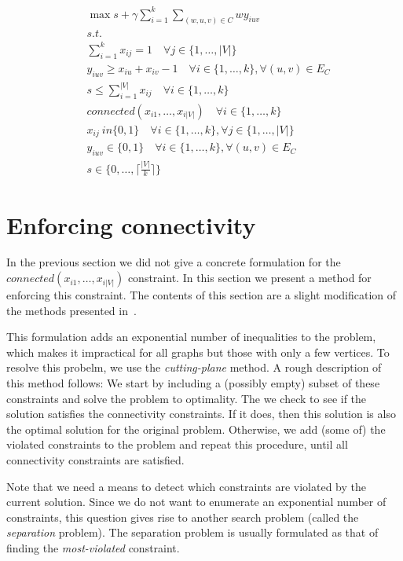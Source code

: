 \documentclass[]{article}
\begin{document}
\begin{align}
&\max s + \gamma \sum_{i=1}^{k} \sum_{(w, u, v) \in C} w y_{iuv} \\
&\textit{s.t.} \\
& \sum_{i=1}^k x_{ij} = 1 \quad \forall j \in \{1, \ldots, |V|\} \\
& y_{iuv} \geq x_{iu} + x_{iv} -1 \quad \forall i \in \{1, \ldots, k\}, \forall (u, v) \in E_{C} \\
&s \leq \sum_{i=1}^{|V|} x_{ij} \quad \forall i \in \{1, \ldots, k\} \\
& connected(x_{i1}, \ldots, x_{i|V|}) \quad \forall i \in \{1, \ldots, k\} \\
& x_{ij} \ in \{0, 1\} \quad \forall i \in \{1, \ldots, k\}, \forall j \in \{1, \ldots, |V|\} \\
& y_{iuv} \in \{0, 1\} \quad \forall i \in \{1, \ldots, k\}, \forall (u, v) \in E_{C} \\
& s \in \{0, \ldots, \lceil \frac{|V|}{k} \rceil \}
\end{align}

\section{Enforcing connectivity}
\label{sec:connectivity}

In the previous section we did not give a concrete formulation for the
$connected(x_{i1}, \ldots, x_{i|V|})$ constraint. In this section we
present a method for enforcing this constraint. The contents of this
section are a slight modification of the methods presented in~\citet{CarvajalCGVW13}.

This formulation adds an exponential number of inequalities to the
problem, which makes it impractical for all graphs but those with only a
few vertices. To resolve this probelm, we use the \emph{cutting-plane}
method. A rough description of this method follows: We start by
including a (possibly empty) subset of these constraints and solve the
problem to optimality. The we check to see if the solution satisfies the
connectivity constraints. If it does, then this solution is also the
optimal solution for the original problem. Otherwise, we add (some of)
the violated constraints to the problem and repeat this procedure, until
all connectivity constraints are satisfied.

Note that we need a means to detect which constraints are violated by
the current solution. Since we do not want to enumerate an exponential
number of constraints, this question gives rise to another search
problem (called the \emph{separation} problem). The separation problem
is usually formulated as that of finding the \emph{most-violated}
constraint.
\end{document}
